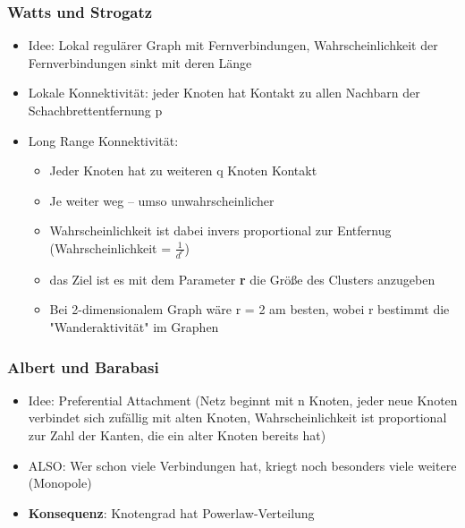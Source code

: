 \documentclass{article} %
\begin{document}
	\subsubsection{Watts und Strogatz}
	\begin{itemize}
		\item Idee: Lokal regulärer Graph mit Fernverbindungen, Wahrscheinlichkeit der Fernverbindungen sinkt mit deren Länge 
		\item Lokale Konnektivität: jeder Knoten hat Kontakt zu allen Nachbarn der Schachbrettentfernung p
		\item Long Range Konnektivität: 
		\begin{itemize}
			\item Jeder Knoten hat zu weiteren q Knoten Kontakt
			\item Je weiter weg – umso unwahrscheinlicher
			\item Wahrscheinlichkeit ist dabei invers proportional zur Entfernug (Wahrscheinlichkeit = $\frac{1}{d^{r}}$)
			\item das Ziel ist es mit dem Parameter \textbf{r} die Größe des Clusters anzugeben
			\item Bei 2-dimensionalem Graph wäre r = 2 am besten, wobei r bestimmt die "Wanderaktivität" im Graphen
		\end{itemize}						 
	\end{itemize}
	
	\subsubsection{Albert und Barabasi}
	\begin{itemize}
		\item Idee: Preferential Attachment (Netz beginnt mit n Knoten, jeder neue Knoten verbindet sich zufällig mit alten Knoten, Wahrscheinlichkeit ist proportional zur Zahl der Kanten, die ein alter Knoten bereits hat)
		\item ALSO: Wer schon viele Verbindungen hat, kriegt noch besonders viele weitere (Monopole)
		\item \textbf{Konsequenz}: Knotengrad hat Powerlaw-Verteilung
	\end{itemize}
	
	
\end{document}

